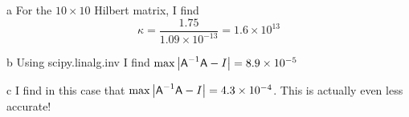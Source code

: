 \documentclass[]{homework}
\begin{document}
\begin{problem}{2}
  \begin{subproblem}{a}
    For the $10\times10$ Hilbert matrix, I find
    \[ \kappa = \frac{1.75}{1.09\times10^{-13}} = 1.6\times10^{13} \]
  \end{subproblem}
  \begin{subproblem}{b}
    Using scipy.linalg.inv I find $\max\left| {\textsf A}^{-1} \textsf A - I \right| = 8.9\times10^{-5}$
  \end{subproblem}
  \begin{subproblem}{c}
    I find in this case that $\max\left| {\textsf A}^{-1} \textsf A - I \right| = 4.3\times10^{-4}$.
    This is actually even less accurate!
  \end{subproblem}
\end{problem}
\end{document}
